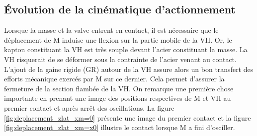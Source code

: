 	\subsection{Évolution de la cinématique d'actionnement}
	\label{subsec:4.3.2_Evolution de la cinematique d'actionnement}
Lorsque la masse et la valve entrent en contact, il est nécessaire que le déplacement de M induise une flexion sur la partie mobile de la VH. Or, le kapton constituant la VH est très souple devant l'acier constituant la masse. La VH risquerait de se déformer sous la contrainte de l'acier venant au contact. L'ajout de la gaine rigide (GR) autour de la VH assure alors un bon transfert des efforts mécanique exercés par M sur ce dernier. Cela permet d'assurer la fermeture de la section flambée de la VH. On remarque une première chose importante en prenant une image des positions respectives de M et VH au premier contact et après arrêt des oscillations. La figure \ref{fig:deplacement_zlat_xm=0} présente une image du premier contact et la figure \ref{fig:deplacement_zlat_xm=x0} illustre le contact lorsque M a fini d'osciller.
